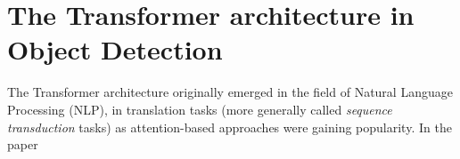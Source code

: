 \chapter{The Transformer architecture in Object Detection}

The Transformer architecture originally emerged in the field of Natural Language Processing (NLP), in translation tasks (more generally called \textit{sequence transduction} tasks) as attention-based approaches were gaining popularity. In the  paper